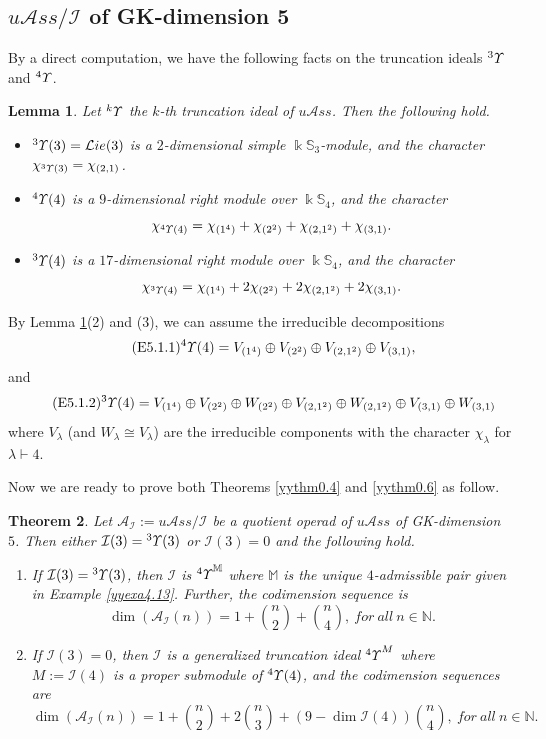 \documentclass{amsart}
\newtheorem{thm}{Theorem}[section]
\newtheorem{lem}[thm]{Lemma}
\theoremstyle{definition}
\theoremstyle{remark}
\numberwithin{equation}{section}
\def\N{\mathbb{N}}
\def\S{\mathbb{S}}
\newcommand{\up}[1]{{^{#1}{\it \!\Upsilon}}}
\def\la{\lambda}
\def \uas{u\mathcal{A}ss}
\def \Lie{\mathcal{L}ie}
\def \I{\mathcal{I}}
\def \dim{\operatorname{dim}}
\def \N{\mathbb{N}}
\def \S{\mathbb{S}}
\begin{document}
\subsection{$\uas/\I$ of GK-dimension 5}
\label{yysec5.1}
By a direct computation, we have the following facts on the 
truncation ideals $\up{3}$ and $\up{4}$. 

\begin{lem}
\label{yylem5.1}
Let $\up{k}$ the $k$-th truncation ideal of $\uas$. Then the 
following hold.
\begin{itemize}
\item[(1)] 
$\up{3}(3)=\Lie(3)$ is a $2$-dimensional simple 
$\Bbbk \S_3$-module, and the character 
$\chi_{\up{3}(3)}=\chi_{(2, 1)}$.
\item[(2)] 
$\up{4}(4)$ is a $9$-dimensional right module over 
$\Bbbk\S_4$, and the character
\[\chi_{\up{4}(4)}=\chi_{(1^4)}+\chi_{(2^2)}
+\chi_{(2, 1^2)}+\chi_{(3, 1)}.\]
\item[(3)] 
$\up{3}(4)$ is a $17$-dimensional right module over 
$\Bbbk \S_4$, and the character
\[\chi_{\up{3}(4)}=\chi_{(1^4)}+2\chi_{(2^2)}
+2\chi_{(2, 1^2)}+2\chi_{(3, 1)}.\]
\end{itemize}
\end{lem}

By Lemma \ref{yylem5.1}(2) and (3), we can assume the irreducible 
decompositions 
\begin{align}
\label{E5.1.1}\tag{E5.1.1}
\up{4}(4)=V_{(1^4)}\oplus V_{(2^2)}\oplus V_{(2, 1^2)}
\oplus V_{(3, 1)},
\end{align}
and 
\begin{equation}
\label{E5.1.2}\tag{E5.1.2}
\up{3}(4) = V_{(1^4)}\oplus V_{(2^2)}\oplus W_{(2^2)} 
\oplus V_{(2, 1^2)}\oplus W_{(2, 1^2)}\oplus V_{(3, 1)}
\oplus W_{(3, 1)}
\end{equation}
where $V_\la$ (and $W_\la\cong V_\la$) are the irreducible 
components with the character $\chi_\la$ for $\la\vdash 4$.

Now we are ready to prove both Theorems \ref{yythm0.4} and 
\ref{yythm0.6} as follow.

\begin{thm}
\label{yythm5.2}
Let $\mathcal{A}_\I:=\uas/\I$ be a quotient operad of 
$\uas$ of GK-dimension $5$. Then either $\I(3)=\up{3}(3)$ or 
$\I(3)=0$ and the following hold.
\begin{enumerate}
\item[(1)] 
If $\I(3)=\up{3}(3)$, then $\I$ is $\up{4}^{\mathbb M}$ 
where ${\mathbb M}$ is the unique $4$-admissible pair 
given in Example {\rm{\ref{yyexa4.13}}}. Further, the 
codimension sequence is 
\[\dim(\mathcal{A}_\I(n))=1+{n\choose 2}+{n\choose 4},
\ for\ all  \ n\in \N.\]
\item[(2)] 
If $\I(3)=0$, then $\I$ is a generalized truncation 
ideal $\up{4}^{M}$ where $M:=\I(4)$ is a proper submodule 
of $\up{4}(4)$, 
and	the codimension sequences are
\[\dim(\mathcal{A}_\I(n))=1+{n\choose 2}+2{n\choose 3}
+(9-\dim \I(4)){n\choose 4}, \ for\  all \ n\in \N.\]
\end{enumerate}
\end{thm}
\end{document}
